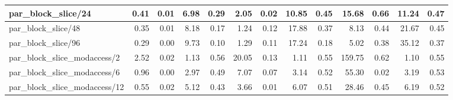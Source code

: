 \begin{table}[H]
\begin{tabular}{|lllllllllllll|}
		\multicolumn{1}{|l|}{par\_block\_slice/24}  & \multicolumn{1}{r|}{0.41} & \multicolumn{1}{r|}{0.01} & \multicolumn{1}{r|}{6.98} & \multicolumn{1}{r|}{0.29}  & \multicolumn{1}{r|}{2.05} & \multicolumn{1}{r|}{0.02} & \multicolumn{1}{r|}{10.85} & \multicolumn{1}{r|}{0.45}  & \multicolumn{1}{r|}{15.68} & \multicolumn{1}{r|}{0.66} & \multicolumn{1}{r|}{11.24} & \multicolumn{1}{r|}{0.47}  \\ \hline
		\multicolumn{1}{|l|}{par\_block\_slice/48}  & \multicolumn{1}{r|}{0.35} & \multicolumn{1}{r|}{0.01} & \multicolumn{1}{r|}{8.18} & \multicolumn{1}{r|}{0.17}  & \multicolumn{1}{r|}{1.24} & \multicolumn{1}{r|}{0.12} & \multicolumn{1}{r|}{17.88} & \multicolumn{1}{r|}{0.37}  & \multicolumn{1}{r|}{8.13} & \multicolumn{1}{r|}{0.44} & \multicolumn{1}{r|}{21.67} & \multicolumn{1}{r|}{0.45}  \\ \hline
		\multicolumn{1}{|l|}{par\_block\_slice/96}  & \multicolumn{1}{r|}{0.29} & \multicolumn{1}{r|}{0.00} & \multicolumn{1}{r|}{9.73} & \multicolumn{1}{r|}{0.10}  & \multicolumn{1}{r|}{1.29} & \multicolumn{1}{r|}{0.11} & \multicolumn{1}{r|}{17.24} & \multicolumn{1}{r|}{0.18}  & \multicolumn{1}{r|}{5.02} & \multicolumn{1}{r|}{0.38} & \multicolumn{1}{r|}{35.12} & \multicolumn{1}{r|}{0.37}  \\ \hline
		\multicolumn{1}{|l|}{par\_block\_slice\_modaccess/2}  & \multicolumn{1}{r|}{2.52} & \multicolumn{1}{r|}{0.02} & \multicolumn{1}{r|}{1.13} & \multicolumn{1}{r|}{0.56}  & \multicolumn{1}{r|}{20.05} & \multicolumn{1}{r|}{0.13} & \multicolumn{1}{r|}{1.11} & \multicolumn{1}{r|}{0.55}  & \multicolumn{1}{r|}{159.75} & \multicolumn{1}{r|}{0.62} & \multicolumn{1}{r|}{1.10} & \multicolumn{1}{r|}{0.55}  \\ \hline
		\multicolumn{1}{|l|}{par\_block\_slice\_modaccess/6}  & \multicolumn{1}{r|}{0.96} & \multicolumn{1}{r|}{0.00} & \multicolumn{1}{r|}{2.97} & \multicolumn{1}{r|}{0.49}  & \multicolumn{1}{r|}{7.07} & \multicolumn{1}{r|}{0.07} & \multicolumn{1}{r|}{3.14} & \multicolumn{1}{r|}{0.52}  & \multicolumn{1}{r|}{55.30} & \multicolumn{1}{r|}{0.02} & \multicolumn{1}{r|}{3.19} & \multicolumn{1}{r|}{0.53}  \\ \hline
		\multicolumn{1}{|l|}{par\_block\_slice\_modaccess/12}  & \multicolumn{1}{r|}{0.55} & \multicolumn{1}{r|}{0.02} & \multicolumn{1}{r|}{5.12} & \multicolumn{1}{r|}{0.43}  & \multicolumn{1}{r|}{3.66} & \multicolumn{1}{r|}{0.01} & \multicolumn{1}{r|}{6.07} & \multicolumn{1}{r|}{0.51}  & \multicolumn{1}{r|}{28.46} & \multicolumn{1}{r|}{0.45} & \multicolumn{1}{r|}{6.19} & \multicolumn{1}{r|}{0.52}  \\ \hline

\end{tabular}
\end{table}
